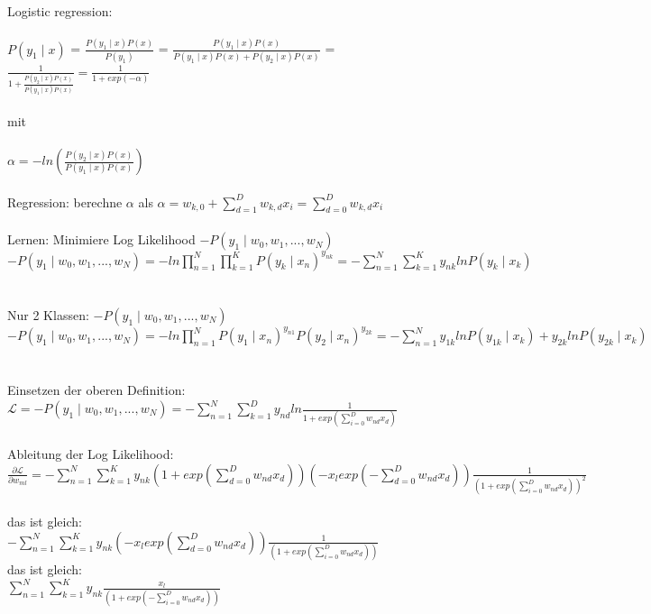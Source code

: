 \documentclass[10pt,a4paper]{article}
\begin{document}
Logistic regression:
~\\\\
$P(y_1\mid x)$ = $\frac{P(y_1\mid x)P(x)}{P(y_1)}$ = $\frac{P(y_1\mid x)P(x)}{P(y_1\mid x)P(x) + P(y_2\mid x)P(x)}$ = $\frac{1}{1 + \frac{P(y_2\mid x)P(x)}{P(y_1\mid x)P(x)}} = \frac{1}{1 + exp(-\alpha)}$
~\\\\
mit 
~\\\\
$\alpha = -ln\left( \frac{P(y_2\mid x)P(x)}{P(y_1\mid x)P(x)} \right)$
~\\\\
Regression: berechne $\alpha$ als
$\alpha = w_{k,0} + \sum_{d=1}^D w_{k,d} x_i = \sum_{d=0}^D w_{k,d} x_i$ 
~\\\\
Lernen:
Minimiere Log Likelihood $-P(y_1\mid w_0, w_1, ..., w_N)$
$-P(y_1\mid w_0, w_1, ..., w_N) = - ln\prod_{n=1}^N \prod_{k=1}^K P(y_k\mid x_n)^{y_{nk}} = -\sum_{n=1}^N \sum_{k=1}^K y_{nk} ln P(y_k \mid x_k)$
~\\\\

Nur 2 Klassen:
$-P(y_1\mid w_0, w_1, ..., w_N)$
$-P(y_1\mid w_0, w_1, ..., w_N) = - ln\prod_{n=1}^N P(y_1\mid x_n)^{y_{n1}} P(y_2\mid x_n)^{y_{2k}} = -\sum_{n=1}^N y_{1k} ln P(y_{1k} \mid x_k) + y_{2k} ln P(y_{2k} \mid x_k)$
~\\\\

Einsetzen der oberen Definition:\\
$\mathcal{L} = -P(y_1\mid w_0, w_1, ..., w_N) = -\sum_{n=1}^N \sum_{k=1}^D y_{nd} ln\frac{1}{1 + exp(\sum_{i=0}^D w_{nd}x_d)}$
~\\\\

Ableitung der Log Likelihood:\\
$\frac{\partial \mathcal{L}}{\partial w_{ml}} = -\sum_{n=1}^N \sum_{k=1}^K y_{nk}(1 + exp(\sum_{d=0}^D w_{nd}x_d)) (-x_l exp(-\sum_{d=0}^D w_{nd}x_d)) \frac{1}{(1 + exp(\sum_{i=0}^D w_{nd}x_d))^2}$
~\\
das ist gleich:\\

$-\sum_{n=1}^N \sum_{k=1}^K y_{nk} (-x_l exp(\sum_{d=0}^D w_{nd}x_d)) \frac{1}{(1 + exp(\sum_{i=0}^D w_{nd}x_d))}$
~\\
das ist gleich:\\


$\sum_{n=1}^N \sum_{k=1}^K y_{nk} \frac{x_l}{(1 + exp(-\sum_{i=0}^D w_{nd}x_d))}$
~\\\\
~\\\\
\end{document}

